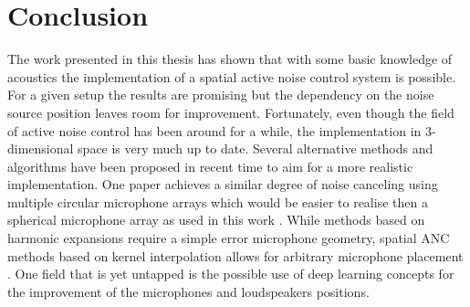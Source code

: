 \chapter{Conclusion}
The work presented in this thesis has shown that with some basic knowledge of acoustics the implementation of a spatial active noise control system is possible. For a given setup the results are promising but the dependency on the noise source position leaves room for improvement. Fortunately, even though the field of active noise control has been around for a while, the implementation in 3-dimensional space is very much up to date. Several alternative methods and algorithms have been proposed in recent time to aim for a more realistic implementation. One paper achieves a similar degree of noise canceling using multiple circular microphone arrays which would be easier to realise then a spherical microphone array as used in this work \cite{}. While methods based on harmonic expansions require a simple error microphone geometry, spatial ANC methods based on kernel interpolation allows for arbitrary microphone placement \cite{}. One field that is yet untapped is the possible use of deep learning concepts for the improvement of the microphones and loudspeakers positions.